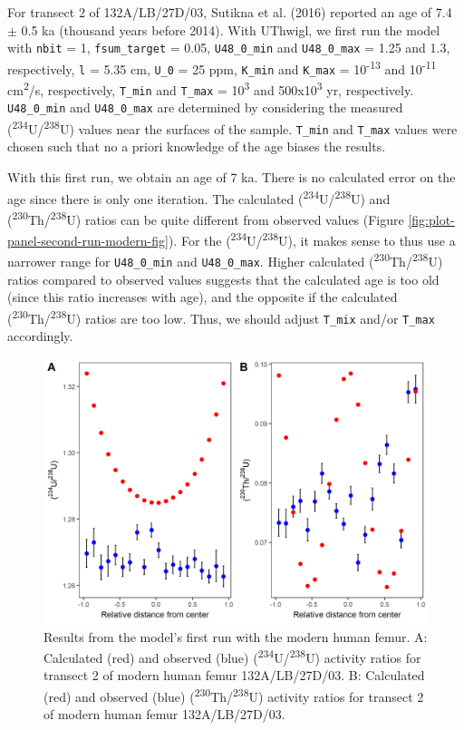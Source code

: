 \documentclass[]{elsarticle} %
\begin{document}
For transect 2 of 132A/LB/27D/03, Sutikna et al. (2016) reported an age of 7.4 \(\pm\) 0.5 ka (thousand years before 2014). With UThwigl, we first run the model with \texttt{nbit} = 1, \texttt{fsum\_target} = 0.05, \texttt{U48\_0\_min} and \texttt{U48\_0\_max} = 1.25 and 1.3, respectively, \texttt{l} = 5.35 cm, \texttt{U\_0} = 25 ppm, \texttt{K\_min} and \texttt{K\_max} = 10\textsuperscript{-13} and 10\textsuperscript{-11} cm\textsuperscript{2}/s, respectively, \texttt{T\_min} and \texttt{T\_max} = 10\textsuperscript{3} and 500x10\textsuperscript{3} yr, respectively. \texttt{U48\_0\_min} and \texttt{U48\_0\_max} are determined by considering the measured (\textsuperscript{234}U/\textsuperscript{238}U) values near the surfaces of the sample. \texttt{T\_min} and \texttt{T\_max} values were chosen such that no a priori knowledge of the age biases the results.

With this first run, we obtain an age of 7 ka. There is no calculated error on the age since there is only one iteration. The calculated (\textsuperscript{234}U/\textsuperscript{238}U) and (\textsuperscript{230}Th/\textsuperscript{238}U) ratios can be quite different from observed values (Figure \ref{fig:plot-panel-second-run-modern-fig}). For the (\textsuperscript{234}U/\textsuperscript{238}U), it makes sense to thus use a narrower range for \texttt{U48\_0\_min} and \texttt{U48\_0\_max}. Higher calculated (\textsuperscript{230}Th/\textsuperscript{238}U) ratios compared to observed values suggests that the calculated age is too old (since this ratio increases with age), and the opposite if the calculated (\textsuperscript{230}Th/\textsuperscript{238}U) ratios are too low. Thus, we should adjust \texttt{T\_mix} and/or \texttt{T\_max} accordingly.



\begin{figure}
\includegraphics[width=0.95\linewidth]{figures/plot-panel-first-run-modern} \caption{Results from the model's first run with the modern human femur. A: Calculated (red) and observed (blue) (\textsuperscript{234}U/\textsuperscript{238}U) activity ratios for transect 2 of modern human femur 132A/LB/27D/03. B: Calculated (red) and observed (blue) (\textsuperscript{230}Th/\textsuperscript{238}U) activity ratios for transect 2 of modern human femur 132A/LB/27D/03.}\label{fig:plot-panel-first-run-modern-fig}
\end{figure}
\end{document}
